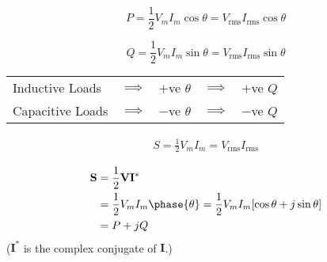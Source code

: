 \begin{multicols}{2}
\begin{CheatsheetEntryFrame}


        \begin{equation*}
            P = \frac{1}{2} V_m I_m \cos{\theta} = V_{\text{rms}} I_{\text{rms}} \cos{\theta}
        \end{equation*}

        \begin{equation*}
            Q = \frac{1}{2} V_m I_m \sin{\theta} = V_{\text{rms}} I_{\text{rms}} \sin{\theta}
        \end{equation*}
        {\scriptsize%
        \begin{tabular}{lcccc}
            Inductive Loads
                & $\implies$
                & $+$ve $\theta$
                & $\implies$
                & $+$ve $Q$
                \\
            Capacitive Loads
                & $\implies$
                & $-$ve $\theta$
                & $\implies$
                & $-$ve $Q$
                \\
        \end{tabular}
        }

        \CheatsheetEntryExtraSeparation

        \begin{align*}
            S = \frac{1}{2} V_m I_m = V_{\text{rms}} I_{\text{rms}}
        \end{align*}

    \end{CheatsheetEntryFrame}

    \begin{CheatsheetEntryFrame}

        \begin{align*}
            \mathbf{S}
                &= \frac{1}{2} \mathbf{V} \mathbf{I}^* \\
                &= \frac{1}{2} V_m I_m \phase{\theta}
                = \frac{1}{2} V_m I_m \brackets*{\cos{\theta} + j \sin{\theta}} \\
                &= P + j Q
        \end{align*}
        ($\mathbf{I}^*$ is the complex conjugate of $\mathbf{I}$.)


\end{CheatsheetEntryFrame}
\end{multicols}
